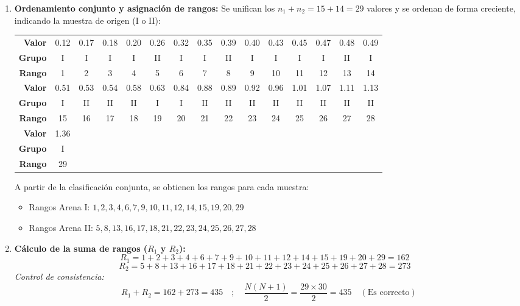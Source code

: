 \documentclass[11pt,a4paper]{article}
\begin{document}
\begin{enumerate}
    \item \textbf{Ordenamiento conjunto y asignación de rangos:}
    Se unifican los $n_1 + n_2 = 15 + 14 = 29$ valores y se ordenan de forma creciente, indicando la muestra de origen (I o II):
    \begin{center}
    \scriptsize
    \begin{tabular}{r cccccccccccccc}
        \toprule
        \textbf{Valor} & 0.12 & 0.17 & 0.18 & 0.20 & 0.26 & 0.32 & 0.35 & 0.39 & 0.40 & 0.43 & 0.45 & 0.47 & 0.48 & 0.49 \\
        \textbf{Grupo} & I & I & I & I & II & I & I & II & I & I & I & I & II & I \\
        \textbf{Rango} & 1 & 2 & 3 & 4 & 5 & 6 & 7 & 8 & 9 & 10 & 11 & 12 & 13 & 14 \\
        \midrule
        \textbf{Valor} & 0.51 & 0.53 & 0.54 & 0.58 & 0.63 & 0.84 & 0.88 & 0.89 & 0.92 & 0.96 & 1.01 & 1.07 & 1.11 & 1.13 \\
        \textbf{Grupo} & I & II & II & II & I & I & II & II & II & II & II & II & II & II \\
        \textbf{Rango} & 15 & 16 & 17 & 18 & 19 & 20 & 21 & 22 & 23 & 24 & 25 & 26 & 27 & 28 \\
        \midrule
        \textbf{Valor} & 1.36 \\
        \textbf{Grupo} & I \\
        \textbf{Rango} & 29 \\
        \bottomrule
    \end{tabular}
    \end{center}

    A partir de la clasificación conjunta, se obtienen los rangos para cada muestra:
    \begin{itemize}
        \item Rangos Arena I: $1, 2, 3, 4, 6, 7, 9, 10, 11, 12, 14, 15, 19, 20, 29$
        \item Rangos Arena II: $5, 8, 13, 16, 17, 18, 21, 22, 23, 24, 25, 26, 27, 28$
    \end{itemize}

    \item \textbf{Cálculo de la suma de rangos ($R_1$ y $R_2$):}
    \[ R_1 = 1 + 2 + 3 + 4 + 6 + 7 + 9 + 10 + 11 + 12 + 14 + 15 + 19 + 20 + 29 = 162 \quad \]
    \[ R_2 = 5 + 8 + 13 + 16 + 17 + 18 + 21 + 22 + 23 + 24 + 25 + 26 + 27 + 28 = 273 \quad \]
    \textit{Control de consistencia:}
    \[ R_1 + R_2 = 162 + 273 = 435 \quad ; \quad \frac{N(N+1)}{2} = \frac{29 \times 30}{2} = 435 \quad (\text{Es correcto}) \]


\end{enumerate}
\end{document}
